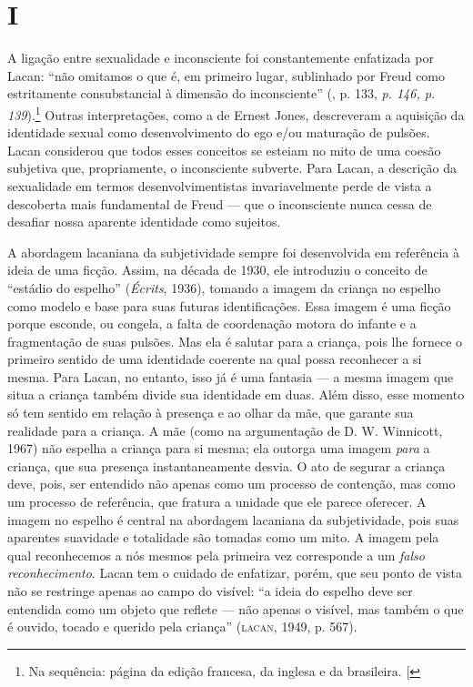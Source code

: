 \section{I}

A ligação entre sexualidade e inconsciente foi constantemente enfatizada
por Lacan: ``não omitamos o que é, em primeiro lugar, sublinhado por
Freud como estritamente consubstancial à dimensão do inconsciente''
(, p. 133, \emph{p. 146, p. 139}).\footnote{Na sequência: página da
  edição francesa, da inglesa e da brasileira. {[}\versal{N.~T.}{]}} Outras
interpretações, como a de Ernest Jones, descreveram a aquisição da
identidade sexual como desenvolvimento do ego e/ou maturação de pulsões.
Lacan considerou que todos esses conceitos se esteiam no mito de uma
coesão subjetiva que, propriamente, o inconsciente subverte. Para Lacan,
a descrição da sexualidade em termos desenvolvimentistas invariavelmente
perde de vista a descoberta mais fundamental de Freud --- que o
inconsciente nunca cessa de desafiar nossa aparente identidade como
sujeitos.

A abordagem lacaniana da subjetividade sempre foi desenvolvida em
referência à ideia de uma ficção. Assim, na década de 1930, ele
introduziu o conceito de ``estádio do espelho'' (\emph{Écrits}, 1936),
tomando a imagem da criança no espelho como modelo e base para suas
futuras identificações. Essa imagem é uma ficção porque esconde, ou
congela, a falta de coordenação motora do infante e a fragmentação de
suas pulsões. Mas ela é salutar para a criança, pois lhe fornece o
primeiro sentido de uma identidade coerente na qual possa reconhecer a
si mesma. Para Lacan, no entanto, isso já é uma fantasia --- a mesma
imagem que situa a criança também divide sua identidade em duas. Além
disso, esse momento só tem sentido em relação à presença e ao olhar da
mãe, que garante sua realidade para a criança. A mãe (como na
argumentação de D. W. Winnicott, 1967) não espelha a criança
para si mesma; ela outorga uma imagem \emph{para} a criança, que sua
presença instantaneamente desvia. O ato de segurar a criança deve, pois,
ser entendido não apenas como um processo de contenção, mas como um
processo de referência, que fratura a unidade que ele parece oferecer. A
imagem no espelho é central na abordagem lacaniana da subjetividade,
pois suas aparentes suavidade e totalidade são tomadas como um mito. A
imagem pela qual reconhecemos a nós mesmos pela primeira vez corresponde
a um \emph{falso reconhecimento}. Lacan tem o cuidado de enfatizar,
porém, que seu ponto de vista não se restringe apenas ao campo do
visível: ``a ideia do espelho deve ser entendida como um objeto que
reflete --- não apenas o visível, mas também o que é ouvido, tocado e
querido pela criança'' (\textsc{lacan}, 1949, p. 567).

